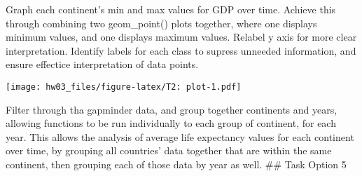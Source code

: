 \documentclass[]{article}
\newenvironment{Shaded}{\begin{snugshade}}{\end{snugshade}}
\newcommand{\DataTypeTok}[1]{\textcolor[rgb]{0.13,0.29,0.53}{#1}}
\newcommand{\DecValTok}[1]{\textcolor[rgb]{0.00,0.00,0.81}{#1}}
\newcommand{\FloatTok}[1]{\textcolor[rgb]{0.00,0.00,0.81}{#1}}
\newcommand{\KeywordTok}[1]{\textcolor[rgb]{0.13,0.29,0.53}{\textbf{#1}}}
\newcommand{\NormalTok}[1]{#1}
\newcommand{\OperatorTok}[1]{\textcolor[rgb]{0.81,0.36,0.00}{\textbf{#1}}}
\newcommand{\StringTok}[1]{\textcolor[rgb]{0.31,0.60,0.02}{#1}}
\begin{document}
Graph each continent's min and max values for GDP over time. Achieve
this through combining two geom\_point() plots together, where one
displays minimum values, and one displays maximum values. Relabel y axis
for more clear interpretation. Identify labels for each class to supress
unneeded information, and ensure effectice interpretation of data
points.

\begin{Shaded}
\end{Shaded}

\texttt{[image: hw03\_files/figure-latex/T2: plot-1.pdf]}

Filter through tha gapminder data, and group together continents and
years, allowing functions to be run individually to each group of
continent, for each year. This allows the analysis of average life
expectancy values for each continent over time, by grouping all
countries' data together that are within the same continent, then
grouping each of those data by year as well. \#\# Task Option 5
\end{document}
